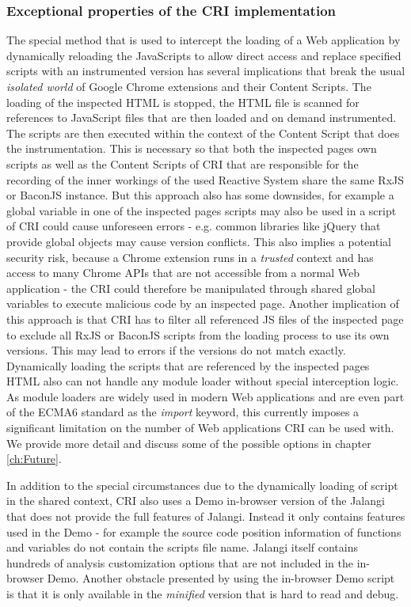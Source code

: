 	\subsubsection{Exceptional properties of the CRI implementation}
	The special method that is used to intercept the loading of a Web application by dynamically reloading the JavaScripts to allow direct access and replace specified scripts with an instrumented version has several implications that break the usual \emph{isolated world} \cite{GoogleApiContentScripts} of Google Chrome extensions and their Content Scripts. The loading of the inspected HTML is stopped, the HTML file is scanned for references to JavaScript files that are then loaded and on demand instrumented. The scripts are then executed within the context of the Content Script that does the instrumentation. This is necessary so that both the inspected pages own scripts as well as the Content Scripts of CRI that are responsible for the recording of the inner workings of the used Reactive System share the same RxJS or BaconJS instance. But this approach also has some downsides, for example a global variable in one of the inspected pages scripts may also be used in a script of CRI could cause unforeseen errors - e.g. common libraries like jQuery \cite{jQuery} that provide global objects may cause version conflicts. This also implies a potential security risk, because a Chrome extension runs in a \emph{trusted} context and has access to many Chrome APIs that are not accessible from a normal Web application - the CRI could therefore be manipulated through shared global variables to execute malicious code by an inspected page.
	Another implication of this approach is that CRI has to filter all referenced JS files of the inspected page to exclude all RxJS or BaconJS scripts from the loading process to use its own versions. This may lead to errors if the versions do not match exactly.
	Dynamically loading the scripts that are referenced by the inspected pages HTML also can not handle any module loader without special interception logic. As module loaders are widely used in modern Web applications and are even part of the ECMA6 \cite{ECMA6import} standard as the \emph{import} keyword, this currently imposes a significant limitation on the number of Web applications CRI can be used with. We provide more detail and discuss some of the possible options in chapter \ref{ch:Future}.
	
	
	In addition to the special circumstances due to the dynamically loading of script in the shared context, CRI also uses a Demo \cite{JalangiDemo} in-browser version of the Jalangi \cite{Jalangi} that does not provide the full features of Jalangi. Instead it only contains features used in the Demo - for example the source code position information of functions and variables do not contain the scripts file name. Jalangi itself contains hundreds of analysis customization options that are not included in the in-browser Demo. Another obstacle presented by using the in-browser Demo script is that it is only available in the \emph{minified} version that is hard to read and debug.
	
